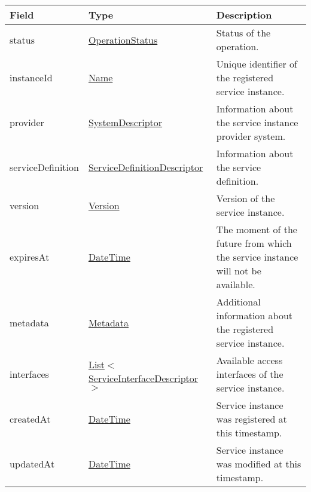 \documentclass[a4paper]{arrowhead}
\newcommand{\pref}[1]{{\textcolor{ArrowheadGrey}{\hyperref[sec:model:primitives:#1]{#1}}}}
\begin{document}
\begin{table}[ht!]
\begin{tabularx}{\textwidth}{| p{3cm} | p{5cm} | X |} \hline
\rowcolor{gray!33} Field & Type      & Description \\ \hline
status & \pref{OperationStatus} & Status of the operation. \\ \hline
instanceId & \pref{Name} & Unique identifier of the registered service instance. \\ \hline
provider & \hyperref[sec:model:SystemDescriptor]{SystemDescriptor} & Information about the service instance provider system. \\ \hline
serviceDefinition & \hyperref[sec:model:ServiceDefinitionDescriptor]{ServiceDefinitionDescriptor} & Information about the service definition. \\ \hline
version & \pref{Version} & Version of the service instance. \\ \hline
expiresAt & \pref{DateTime} & The moment of the future from which the service ins\-tance will not be available. \\ \hline
metadata & \hyperref[sec:model:Metadata]{Metadata} & Additional information about the registered service ins\-tance. \\ \hline
interfaces & \pref{List}$<$\hyperref[sec:model:ServiceInterfaceDescriptor]{ServiceInterfaceDescriptor}$>$ & Available access interfaces of the service instance. \\ \hline
createdAt & \pref{DateTime} & Service instance was registered at this timestamp. \\ \hline
updatedAt & \pref{DateTime} & Service instance was modified at this timestamp. \\ \hline
\end{tabularx}
\end{table}

\label{sec:model:SystemDescriptor}
 
\end{document}
